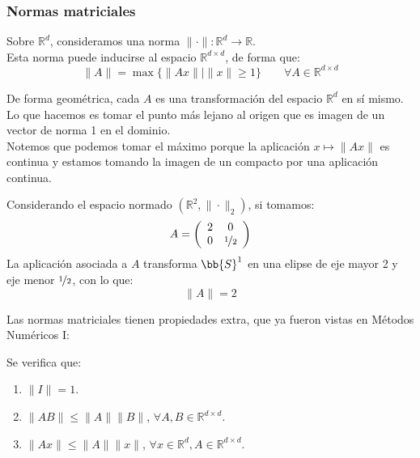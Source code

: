 \subsubsection{Normas matriciales}
Sobre $\mathbb{R}^d$, consideramos una norma $\|\cdot \|:\mathbb{R}^d\rightarrow\mathbb{R}$.\\

Esta norma puede inducirse al espacio $\mathbb{R}^{d\times d}$, de forma que:
\begin{equation*}
    \|A\| = \max\{\|Ax\| \mid \|x\|\geq 1\} \qquad \forall A\in \mathbb{R}^{d\times d}
\end{equation*}

De forma geométrica, cada $A$ es una transformación del espacio $\mathbb{R}^d$ en sí mismo. Lo que hacemos es tomar el punto más lejano al origen que es imagen de un vector de norma 1 en el dominio.\\

Notemos que podemos tomar el máximo porque la aplicación $x\mapsto \|Ax\|$ es continua y estamos tomando la imagen de un compacto por una aplicación continua.

\begin{ejemplo}
    Considerando el espacio normado $(\mathbb{R}^2, \|\cdot \|_2)$, si tomamos:
    \begin{equation*}
        A = \left(\begin{array}{cc}
                2 & 0 \\
                0 & \nicefrac{1}{2}
        \end{array}\right)
    \end{equation*}
    La aplicación asociada a $A$ transforma $\bb{S}^1$ en una elipse de eje mayor 2 y eje menor $\nicefrac{1}{2}$, con lo que:
    \begin{equation*}
        \|A\| = 2
    \end{equation*}
\end{ejemplo}

Las normas matriciales tienen propiedades extra, que ya fueron vistas en Métodos Numéricos I\@:
\begin{prop}
    Se verifica que:
    \begin{enumerate}
        \item $\|I\| = 1$.
        \item $\|AB\| \leq \|A\|\|B\|$, $\forall A,B\in \mathbb{R}^{d\times d}$.
        \item $\|Ax\| \leq \|A\|\|x\|$, $\forall x\in \mathbb{R}^d, A\in \mathbb{R}^{d\times d}$.
    \end{enumerate}
\end{prop}

